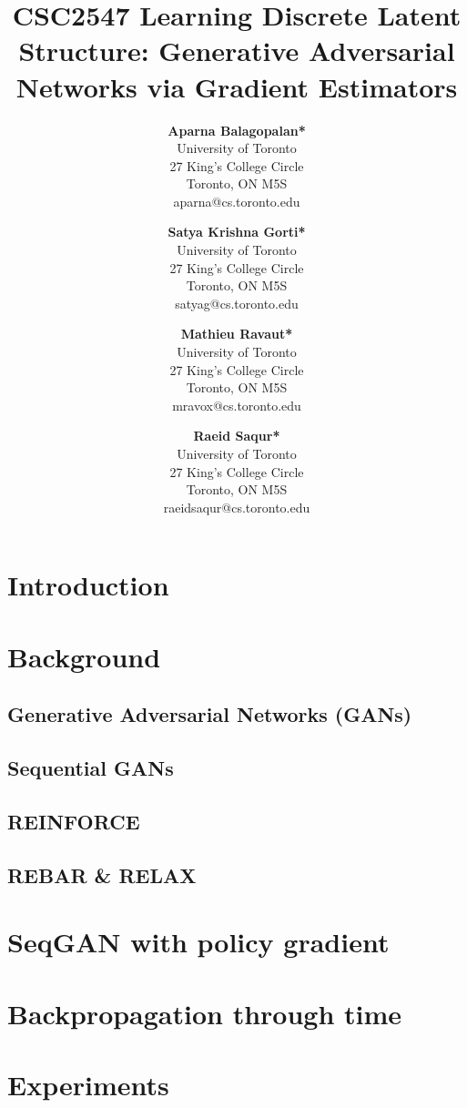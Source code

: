 \documentclass[11pt, english]{article}
\title{CSC2547 Learning Discrete Latent Structure: Generative Adversarial Networks via Gradient Estimators}
\author{
  	\textbf{Aparna Balagopalan*}\\
	University of Toronto\\
	27 King's College Circle\\
	Toronto, ON M5S\\
	aparna@cs.toronto.edu
	\and
  	\textbf{Satya Krishna Gorti*}\\
	University of Toronto\\
	27 King's College Circle\\
	Toronto, ON M5S\\
	satyag@cs.toronto.edu
	\and
	\textbf{Mathieu Ravaut*} \\ 
	University of Toronto \\
	27 King's College Circle\\
	Toronto, ON M5S\\
	mravox@cs.toronto.edu 
	\and
  	\textbf{Raeid Saqur*}\\
	University of Toronto\\
	27 King's College Circle\\
	Toronto, ON M5S\\
	raeidsaqur@cs.toronto.edu	
}
\begin{document}
  
  
  \maketitle
  
  \begin{abstract}

  \end{abstract}
  
  \thispagestyle{equalc}
  \section{Introduction}
  
  \section{Background}
  
  \subsection{Generative Adversarial Networks (GANs)}
  
  \subsection{Sequential GANs}
  
  \subsection{REINFORCE}
  
  \subsection{REBAR \& RELAX}
  
  \section{SeqGAN with policy gradient}
  
  \section{Backpropagation through time}
  
  \section{Experiments}
  
\end{document}
